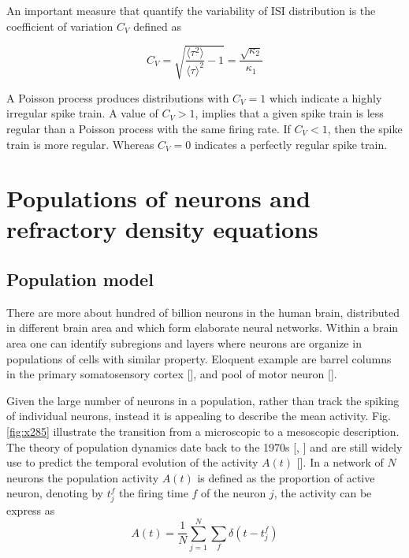 \documentclass[12pt,twoside]{report}
\begin{document}
An important measure that quantify the variability of ISI distribution is the coefficient of variation $C_V$ defined as


\begin{equation}
\label{eq:CV}
C_V=\sqrt{\frac{\langle\tau^2\rangle}{\langle\tau\rangle^2}-1}=\frac{\sqrt{\kappa_2}}{\kappa_1}
\end{equation}

A Poisson process produces distributions with $C_V=1$ which indicate a highly irregular spike train. A value of $C_V>1$, implies that a given spike train is less regular than a Poisson process with the same firing rate. If $C_V<1$, then the spike train is more regular. Whereas  $C_V=0$ indicates a perfectly regular spike train.


\section{Populations of neurons and refractory density equations}
\label{sec:refractory}
\subsection{Population model}

There are more about hundred of billion neurons in the human brain, distributed in different brain area and which form elaborate neural networks. Within a brain area one can identify subregions and layers where neurons are organize in populations of cells with similar property. Eloquent example are barrel columns in the primary somatosensory cortex [\cite{Lef09}], and pool of motor neuron [\cite{KanSch00}].


Given the large number of neurons in a population, rather than track the spiking of individual neurons, instead it is appealing to describe the mean activity. Fig.\ref{fig:x285} illustrate the transition from a microscopic to a mesoscopic description. The theory of population dynamics date back to the 1970s [\cite{Kni72}, \cite{WilCow72}] and are still widely use to predict the temporal evolution of the activity $A(t)$ [\cite{SchDeg17}]. In a network of $N$ neurons the population activity $A(t)$ is defined as the proportion of active neuron, denoting by $t^f_j$ the firing time $f$ of the neuron $j$, the activity can be express as
\begin{equation}
A(t)=\frac{1}{N}\sum_{j=1}^N\sum_f\delta(t-t_j^f)
\end{equation}
\end{document}
